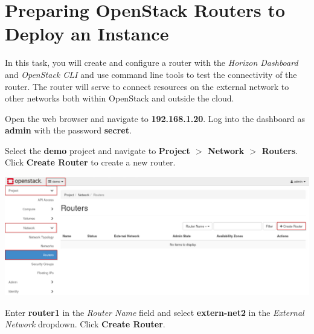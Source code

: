 \documentclass[letterpaper, 12pt]{article}
\begin{document}
\section{Preparing OpenStack Routers to Deploy an Instance}\label{sec:preparing-openstack-routers-to-deploy-an-instance}
In this task, you will create and configure a router with the \textit{Horizon Dashboard} and \textit{OpenStack CLI} and use command line tools to test the connectivity of the router.
The router will serve to connect resources on the external network to other networks both within OpenStack and outside the cloud.

\begin{enumerate}
    \begin{labstep}
        Open the web browser and navigate to \textbf{192.168.1.20}.
        Log into the dashboard as \textbf{admin} with the password \textbf{secret}.
    \end{labstep}

    \begin{labstep}
        Select the \textbf{demo} project and navigate to \textbf{Project $>$ Network $>$ Routers}.
        Click \textbf{Create Router} to create a new router.

        \begin{center}
            \includegraphics[width=\linewidth]{images/part2/step2.png}
        \end{center}
    \end{labstep}

    \begin{labstep}
        Enter \textbf{router1} in the \textit{Router Name} field and select \textbf{extern-net2} in the \textit{External Network} dropdown.
        Click \textbf{Create Router}.


\end{labstep}
\end{enumerate}
\end{document}
